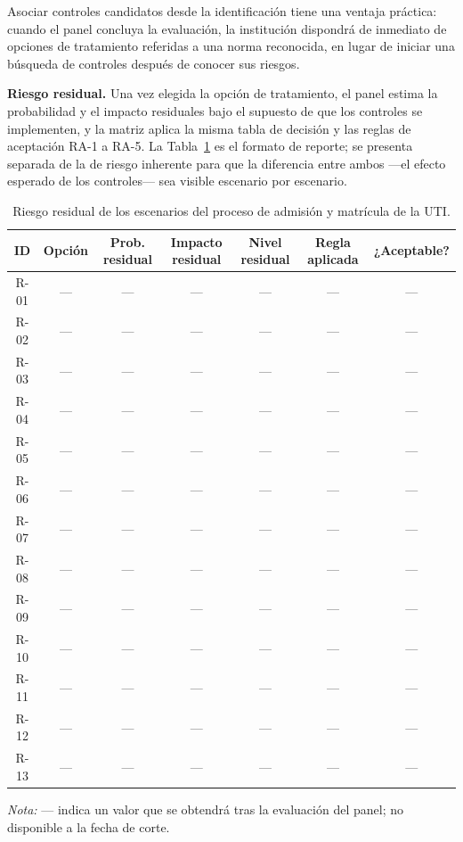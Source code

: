 Asociar controles candidatos desde la identificación tiene una ventaja práctica: cuando el panel concluya la evaluación, la institución dispondrá de inmediato de opciones de tratamiento referidas a una norma reconocida, en lugar de iniciar una búsqueda de controles después de conocer sus riesgos.

\textbf{Riesgo residual.} Una vez elegida la opción de tratamiento, el panel estima la probabilidad y el impacto residuales bajo el supuesto de que los controles se implementen, y la matriz aplica la misma tabla de decisión y las reglas de aceptación RA-1 a RA-5. La Tabla~\ref{tab:riesgo_residual} es el formato de reporte; se presenta separada de la de riesgo inherente para que la diferencia entre ambos ---el efecto esperado de los controles--- sea visible escenario por escenario.

\begin{table}[htbp]
  \centering
  \caption{Riesgo residual de los escenarios del proceso de admisión y matrícula de la UTI.}
  \label{tab:riesgo_residual}
  \scriptsize
  \setlength{\tabcolsep}{3pt}
  \renewcommand{\arraystretch}{1.15}
  \begin{tabular}{|c|c|c|c|c|c|c|}
    \hline
    \textbf{ID} & \textbf{Opción} & \textbf{Prob. residual} & \textbf{Impacto residual} & \textbf{Nivel residual} & \textbf{Regla aplicada} & \textbf{¿Aceptable?} \\
    \hline
    R-01 & --- & --- & --- & --- & --- & --- \\ \hline
    R-02 & --- & --- & --- & --- & --- & --- \\ \hline
    R-03 & --- & --- & --- & --- & --- & --- \\ \hline
    R-04 & --- & --- & --- & --- & --- & --- \\ \hline
    R-05 & --- & --- & --- & --- & --- & --- \\ \hline
    R-06 & --- & --- & --- & --- & --- & --- \\ \hline
    R-07 & --- & --- & --- & --- & --- & --- \\ \hline
    R-08 & --- & --- & --- & --- & --- & --- \\ \hline
    R-09 & --- & --- & --- & --- & --- & --- \\ \hline
    R-10 & --- & --- & --- & --- & --- & --- \\ \hline
    R-11 & --- & --- & --- & --- & --- & --- \\ \hline
    R-12 & --- & --- & --- & --- & --- & --- \\ \hline
    R-13 & --- & --- & --- & --- & --- & --- \\ \hline
  \end{tabular}
  \par\vspace{2pt}
  \raggedright
  \textit{Nota:} --- indica un valor que se obtendrá tras la evaluación del panel; no disponible a la fecha de corte.
\end{table}

